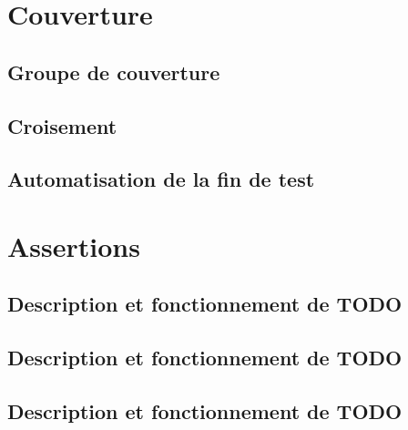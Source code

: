 \documentclass[12pt, titlepage]{article}
\begin{document}
\section{Couverture}
    \subsection{Groupe de couverture} \lipsum[4]
    \subsection{Croisement} \lipsum[4]
    \subsection{Automatisation de la fin de test} \lipsum[4]

\section{Assertions}
    \subsection{Description et fonctionnement de TODO } \lipsum[5]
    \subsection{Description et fonctionnement de TODO } \lipsum[5]
    \subsection{Description et fonctionnement de TODO } \lipsum[5]
\end{document}
